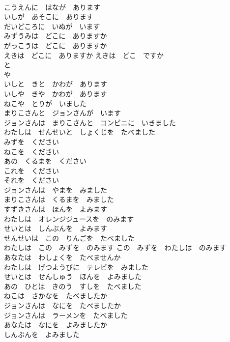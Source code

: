 \documentclass[8pt]{extreport}
\begin{document}
\begin{CJK}{UTF8}{min}
\\	こうえんに　はなが　あります	
\\	いしが　あそこに　あります	
\\	だいどころに　いぬが　います	
\\	みずうみは　どこに　ありますか	
\\	がっこうは　どこに　ありますか	
\\	えきは　どこに　ありますか えきは　どこ　ですか	
\\	と	
\\	や 
\\	いしと　きと　かわが　あります	
\\	いしや　きや　かわが　あります	
\\	ねこや　とりが　いました	
\\	まりこさんと　ジョンさんが　います	
\\	ジョンさんは　まりこさんと　コンビニに　いきました	
\\	わたしは　せんせいと　しょくじを　たべました	
\\	みずを　ください	
\\	ねこを　ください	
\\	あの　くるまを　ください	
\\	これを　ください	
\\	それを　ください	
\\	ジョンさんは　やまを　みました	
\\	まりこさんは　くるまを　みました	
\\	すずきさんは　ほんを　よみます	
\\	わたしは　オレンジジュースを　のみます	
\\	せいとは　しんぶんを　よみます	
\\	せんせいは　この　りんごを　たべました	
\\	わたしは　この　みずを　のみます この　みずを　わたしは　のみます	
\\	あなたは　わしょくを　たべませんか	
\\	わたしは　げつようびに　テレビを　みました	
\\	せいとは　せんしゅう　ほんを　よみました	
\\	あの　ひとは　きのう　すしを　たべました	
\\	ねこは　さかなを　たべましたか	
\\	ジョンさんは　なにを　たべましたか	
\\	ジョンさんは　ラーメンを　たべました	
\\	あなたは　なにを　よみましたか	
\\	しんぶんを　よみました	

\end{CJK}
\end{document}
